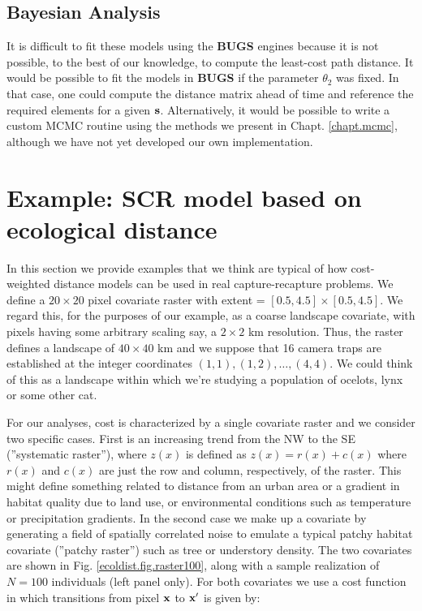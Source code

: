 \subsection{Bayesian Analysis}

It is difficult to fit these models using the {\bf BUGS} engines
because it is not possible, to the best of our knowledge, to compute
the least-cost path distance.  It would be possible to fit the models
in {\bf BUGS} if the parameter $\theta_{2}$ was fixed. In that case,
one could compute the distance matrix ahead of time and reference the
required elements for a given ${\bf s}$.
Alternatively, it would be possible to write a custom MCMC routine
using the methods we present in Chapt. \ref{chapt.mcmc}, although we
have not yet developed our own implementation.




\section{Example: SCR model based on ecological distance}

In this section we provide examples that we think are typical of how
cost-weighted distance models can be used in real capture-recapture
problems.  We define a $20 \times 20$ pixel covariate raster with
extent = $[0.5, 4.5] \times [0.5, 4.5]$.  We regard this, for the
purposes of our example, as a coarse landscape covariate, with pixels
having some arbitrary scaling say, a $2 \times 2$ km resolution. Thus,
the raster defines a landscape of $40 \times 40$ km and we suppose
that 16 camera traps are established at the integer coordinates
$(1,1), (1,2), \ldots, (4,4)$. We could think of this as a landscape
within which we're studying a population of ocelots, lynx or some
other cat.

For our analyses, cost is characterized by a single covariate raster
and we consider two specific cases. First is an increasing trend from
the NW to the SE (''systematic raster''), where $z(x)$ is defined as
$z(x) = r(x) + c(x)$ where $r(x)$ and $c(x)$ are just the row and
column, respectively, of the raster.  This might define something
related to distance from an urban area or a gradient in habitat
quality due to land use, or environmental conditions such as
temperature or precipitation gradients.  In the second case we make up
a covariate by generating a field of spatially correlated noise to
emulate a typical patchy habitat covariate (''patchy raster'') such as
tree or understory density. The two covariates are shown in
Fig. \ref{ecoldist.fig.raster100}, along with a sample realization of
$N=100$ individuals (left panel only).  For both covariates we use a
cost function in which transitions from pixel ${\bf x}$ to ${\bf x}'$
is given by:

